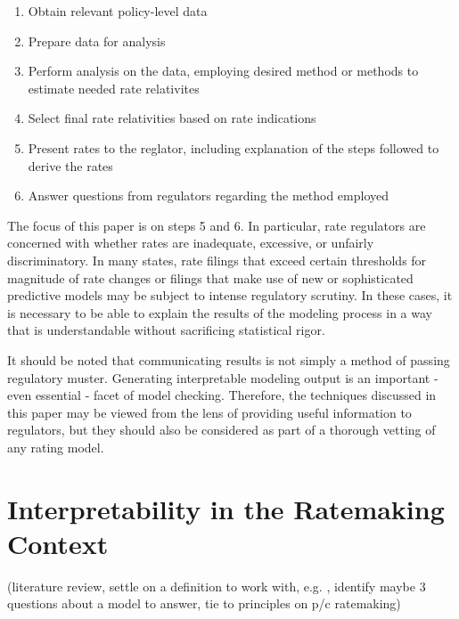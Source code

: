 \documentclass[]{interact}
\theoremstyle{plain}%
\theoremstyle{definition}
\theoremstyle{remark}
\begin{document}
\begin{enumerate}
\def\labelenumi{\arabic{enumi}.}
\tightlist
\item
  Obtain relevant policy-level data
\item
  Prepare data for analysis
\item
  Perform analysis on the data, employing desired method or methods to
  estimate needed rate relativites
\item
  Select final rate relativities based on rate indications
\item
  Present rates to the reglator, including explanation of the steps
  followed to derive the rates
\item
  Answer questions from regulators regarding the method employed
\end{enumerate}

The focus of this paper is on steps 5 and 6. In particular, rate
regulators are concerned with whether rates are inadequate, excessive,
or unfairly discriminatory. In many states, rate filings that exceed
certain thresholds for magnitude of rate changes or filings that make
use of new or sophisticated predictive models may be subject to intense
regulatory scrutiny. In these cases, it is necessary to be able to
explain the results of the modeling process in a way that is
understandable without sacrificing statistical rigor.

It should be noted that communicating results is not simply a method of
passing regulatory muster. Generating interpretable modeling output is
an important - even essential - facet of model checking. Therefore, the
techniques discussed in this paper may be viewed from the lens of
providing useful information to regulators, but they should also be
considered as part of a thorough vetting of any rating model.

\section{Interpretability in the Ratemaking
Context}\label{interpretability}

(literature review, settle on a definition to work with, e.g.
\citet{doshi-velezRigorousScience2017}, identify maybe 3 questions about
a model to answer, tie to principles on p/c ratemaking)
\end{document}
